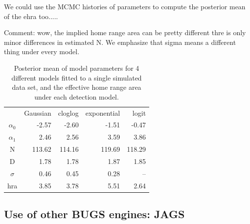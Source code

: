 We could use the MCMC histories of parameters to compute the posterior
mean of the ehra too.....

Comment: wow, the implied home range area can be pretty different thre
is only minor differences in estimated N.
We emphasize that sigma means a different thing under every model. 


\begin{table}
\centering
\caption{
Posterior mean of model parameters for 4 different models fitted to a
single simulated data set,
  and the effective home range area under each detection model.
}
\begin{tabular}{crrrr}
     &  Gaussian & cloglog &exponential & logit \\
$\alpha_0$  &  -2.57 &  -2.60 & -1.51 & -0.47 \\
$\alpha_1$  &  2.46  & 2.56  & 3.59  & 3.86 \\
N           & 113.62& 114.16 &119.69& 118.29 \\
D           & 1.78  & 1.78  & 1.87  & 1.85 \\
$\sigma$    & 0.46  & 0.45 &  0.28  &  -- \\
hra         & 3.85  & 3.78 &  5.51  & 2.64 \\
\end{tabular}
\label{scr0.tab.implied}
\end{table}





\subsection{Use of other BUGS engines: JAGS}

